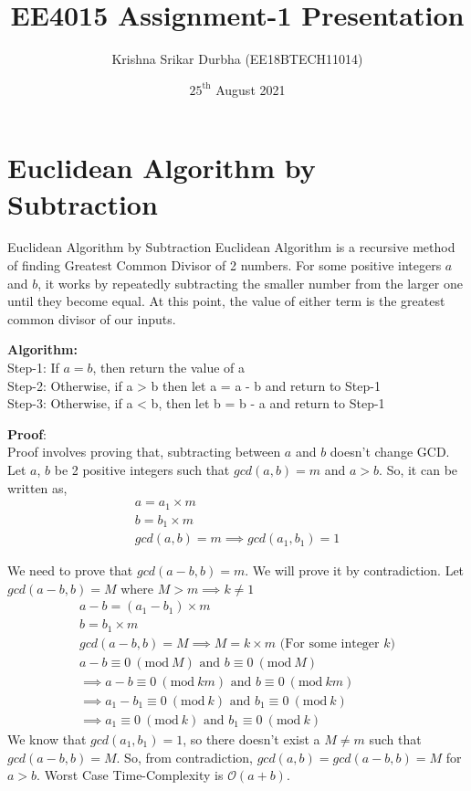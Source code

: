 \documentclass[8pt]{beamer}
\title[Report]{EE4015 Assignment-1 Presentation}
\author{Krishna Srikar Durbha (EE18BTECH11014)}
\date{$25^{\text{th}}$ August 2021}
\begin{document}
\begin{frame}
  \titlepage
\end{frame}

\section{Euclidean Algorithm by Subtraction}
\begin{frame}[allowframebreaks]{Euclidean Algorithm by Subtraction}
Euclidean Algorithm is a recursive method of finding Greatest Common Divisor of 2 numbers. For some positive integers $a$ and $b$, it works by repeatedly subtracting the smaller number from the larger one until they become equal. At this point, the value of either term is the greatest common divisor of our inputs.

\textbf{Algorithm:}\\
Step-1: If $a = b$, then return the value of a\\
Step-2: Otherwise, if a > b then let a = a - b and return to Step-1\\
Step-3: Otherwise, if a < b, then let b = b - a and return to Step-1\\

\vspace{0.2in}

\textbf{Proof}:\\
Proof involves proving that, subtracting between $a$ and $b$ doesn't change GCD. Let $a$, $b$ be 2 positive integers such that $gcd(a,b) = m$ and $a > b$. So, it can be written as,
\begin{align}
    a = a_{1} \times m \\
    b = b_{1} \times m \\
    gcd(a,b) = m \implies gcd(a_{1}, b_{1}) = 1
\end{align}

\framebreak
We need to prove that $gcd(a-b,b) = m$. We will prove it by contradiction. Let $gcd(a-b,b) = M$ where $M > m \implies  k \neq 1$
\begin{align}
    a-b = (a_{1} - b_{1}) \times m\\
    b =  b_{1} \times m\\
    gcd(a-b,b) = M \implies M = k \times m \text{ (For some integer $k$)}\\
    a-b \equiv 0\ (\textrm{mod}\ M) \text{ and } b \equiv 0\ (\textrm{mod}\ M)\\
    \implies a-b \equiv 0\ (\textrm{mod}\ km) \text{ and } b \equiv 0\ (\textrm{mod}\ km)\\
    \implies a_{1} - b_{1} \equiv 0\ (\textrm{mod}\ k) \text{ and } b_{1} \equiv 0\ (\textrm{mod}\ k)\\
    \implies a_{1} \equiv 0\ (\textrm{mod}\ k) \text{ and } b_{1} \equiv 0\ (\textrm{mod}\ k)
\end{align}
We know that $gcd(a_{1}, b_{1}) = 1$, so there doesn't exist a $M \neq m$ such that $gcd(a-b, b) = M$. So, from contradiction, $gcd(a, b) = gcd(a-b, b) = M$ for $a > b$. Worst Case Time-Complexity is $\mathcal{O}(a+b)$.
\end{frame}
\end{document}
